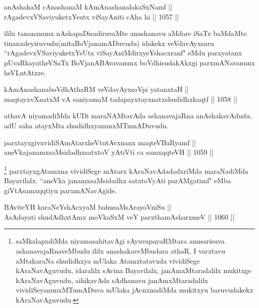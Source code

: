 \begin{shl}
anAshakaM cAnashanaM kAmAnashanalakaSxNamf ||  \\
rAgadevxVSaviyuketxYsutx viSayAniti cA\s \s ha hi \hfill || 1057 ||  
\end{shl}
				
\begin{artha}
ililx tananxnunx nAshapaDisadiruvaMte anashanavu aMdare iSaTx baMdaMte tinanxdeyiruvudu(mitaBoVjanamADuvudu) idakekx veVdavAyxsaru ``rAgadevxVSaviyuketxYsUtx viSayAniMdirxyeYshacxranf" eMdu parxyatanx pUvaRkayatheVSaTx BoVjanABAvavanunx boVdhisudakAkxgi parxmANavanunx heVLutAtxre.
\end{artha}				
				
\begin{shl}
kAmAnashanaboVdhAthaRM veVdavAyxsoV\s pi yatanxtaH || \\
maqtayxvXnatxM vA saniyamaM tadapayxtayxnatxshudidhxkaqtf \hfill || 1058 ||  
\end{shl}

\begin{artha}
athavA niyamadiMda kUDi maraNAMtavAda ashanavajaRna anAshakavAdudu, adU saha atayxMta shudidhxyanunxMTumADuvudu.
\end{artha}

\begin{shl}
parxtayxgivxvidiSAmAtarxheVtutAvxnanx maqteVBaRyamf ||  \\
aneVkajanamxsaMsidadhxsatxtoV yAtiVti ca samxqqteVH \hfill || 1059 ||  
\end{shl}

\begin{artha}
\footnote{saMkalapxdiMda niyamasahitavAgi sAyuvapayaRMtara anusarisuva ashanavajaRnaveMbudu ililx anashakaveMbudara athaR, I varxtavu aMtakaraNa shudidhxya mUlaka Atamxtatavxda vividiSege kAraNavAguvudu, idaralilx sAvina Bayavilalx, janAmxMtaradalilx mukitxge kAraNavAguvudu, aihikavAda sAdhanavu janAmxMtaradalilx vividiSeyanunxMTumADuva mUlaka jAcnxnadiMda mukitxyu baruvudakekx kAraNavAguvudu.} parxtayxgAtamxna vividiSege mAtarx kAraNavAdadadxriMda maraNadiMda Bayavilalx. ``aneVka janamxsaMsidadhx satxtoVyAti parAMgatimf" eMba giVtAsamxqqtiyu parxmANavAgide.
\end{artha}


\begin{shl}
BAviteYH karaNeYshAcxyaM bahusaMsArayoVniSu || \\
AsAdayati shudAdhxtAmx moVkaSxM veY parxthamAsharxmeV \hfill || 1060 ||  
\end{shl}

